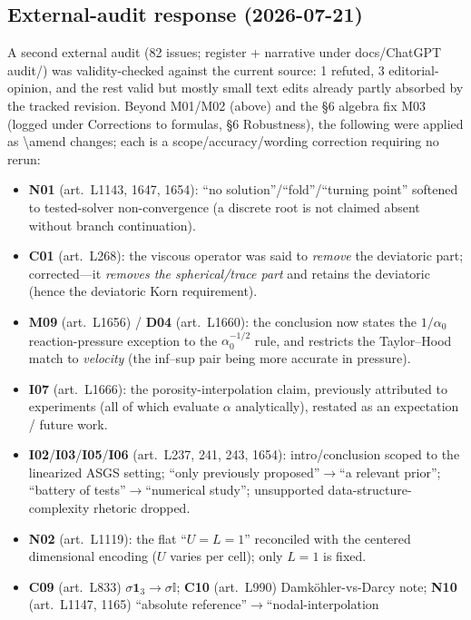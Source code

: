 \documentclass[11pt]{article}
\newcommand{\code}[1]{\textcolor{newc}{\ttfamily\small #1}}
\newcommand{\artl}[1]{art.\ L#1}       %
\begin{document}
\subsection{External-audit response (2026-07-21)}
A second external audit (82 issues; register + narrative under \code{docs/ChatGPT audit/}) was
validity-checked against the current source: 1 refuted, 3 editorial-opinion, and the rest valid but
mostly small text edits already partly absorbed by the tracked revision. Beyond \code{M01}/\code{M02}
(above) and the \S6 algebra fix \code{M03} (logged under Corrections to formulas, \S6 Robustness), the
following were applied as \code{\textbackslash amend} changes; each is a scope/accuracy/wording correction
requiring no rerun:
\begin{itemize}\setlength\itemsep{0pt}
\item \textbf{N01} (\artl{1143}, 1647, 1654): ``no solution''/``fold''/``turning point'' softened to
  tested-solver non-convergence (a discrete root is not claimed absent without branch continuation).
\item \textbf{C01} (\artl{268}): the viscous operator was said to \emph{remove} the deviatoric part;
  corrected---it \emph{removes the spherical/trace part} and retains the deviatoric (hence the deviatoric
  Korn requirement).
\item \textbf{M09} (\artl{1656}) / \textbf{D04} (\artl{1660}): the conclusion now states the $1/\alpha_0$
  reaction-pressure exception to the $\alpha_0^{-1/2}$ rule, and restricts the Taylor--Hood match to
  \emph{velocity} (the inf--sup pair being more accurate in pressure).
\item \textbf{I07} (\artl{1666}): the porosity-interpolation claim, previously attributed to experiments
  (all of which evaluate $\alpha$ analytically), restated as an expectation / future work.
\item \textbf{I02}/\textbf{I03}/\textbf{I05}/\textbf{I06} (\artl{237}, 241, 243, 1654): intro/conclusion
  scoped to the linearized ASGS setting; ``only previously proposed''$\to$``a relevant prior'';
  ``battery of tests''$\to$``numerical study''; unsupported data-structure-complexity rhetoric dropped.
\item \textbf{N02} (\artl{1119}): the flat ``$U=L=1$'' reconciled with the centered dimensional encoding
  ($U$ varies per cell); only $L=1$ is fixed.
\item \textbf{C09} (\artl{833}) $\sigma\boldsymbol 1_3\!\to\!\sigma\mathbb I$; \textbf{C10} (\artl{990})
  Damk\"ohler-vs-Darcy note; \textbf{N10} (\artl{1147}, 1165) ``absolute reference''$\to$``nodal-interpolation

\end{itemize}
\end{document}
